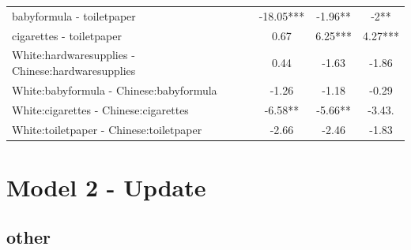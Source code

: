 \documentclass[]{report}
\begin{document}
\begin{table}
\begin{tabular}[t]{lccc}
			babyformula - toiletpaper & -18.05*** & -1.96** & -2** \\ 
			cigarettes - toiletpaper & 0.67 & 6.25*** & 4.27*** \\ 
			White:hardwaresupplies - Chinese:hardwaresupplies & 0.44 & -1.63 & -1.86 \\ 
			White:babyformula - Chinese:babyformula & -1.26 & -1.18 & -0.29 \\ 
			White:cigarettes - Chinese:cigarettes & -6.58** & -5.66** & -3.43. \\ 
			White:toiletpaper - Chinese:toiletpaper & -2.66 & -2.46 & -1.83 \\ 
			\hline
		\end{tabular}
	\end{table}
	
	
	

\chapter{Model 2 - Update}

\section{other}
\end{document}
